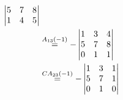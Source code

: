 \begin{example}
\begin{enumerate}
\begin{align*}
\begin{vmatrix}
                5&7&8\\
                1&4&5\\
            \end{vmatrix}\\
            &\stackrel{A_{13}(-1)}{=}-
            \begin{vmatrix}
                1&3&4\\
                5&7&8\\
                0&1&1\\
            \end{vmatrix}\\
            &\stackrel{CA_{23}(-1)}{=}-
            \begin{vmatrix}
                1&3&1\\
                5&7&1\\
                0&1&0\\
            \end{vmatrix}\\
        \end{align*}
        

\end{enumerate}
\end{example}
